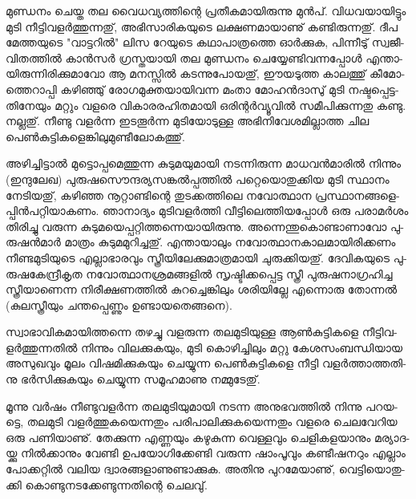 ­മു­ണ്ഡ­നം ചെ­യ്ത തല വൈ­ധ­വ്യ­ത്തി­ന്റെ പ്ര­തീ­ക­മാ­യി­രു­ന്നു മുന്‍­പ്. വി­ധ­വ­യാ­യി­ട്ടും മു­ടി നീ­ട്ടി­വ­ളര്‍­ത്തു­ന്ന­തു്, അഭി­സാ­രി­ക­യു­ടെ 
ലക്ഷ­ണ­മാ­യാ­ണു് കണ്ടി­രു­ന്ന­തു്. ദീപ മേ­ത്ത­യു­ടെ "വാ­ട്ട­റില്‍" ലിസ റേ­യു­ടെ കഥാ­പാ­ത്ര­ത്തെ ഓര്‍­ക്കു­ക, പി­ന്നീ­ടു് 
സ്വ­ജീ­വി­ത­ത്തില്‍ കാന്‍­സര്‍ ഗ്ര­സ്ത­യാ­യി തല മു­ണ്ഡ­നം ചെ­യ്യേ­ണ്ടി­വ­ന്ന­പ്പോള്‍ എന്താ­യി­രു­ന്നി­രി­ക്കു­മാ­വോ ആ മന­സ്സില്‍ 
കട­ന്നു­പോ­യ­തു്, ഈയ­ടു­ത്ത കാ­ല­ത്തു് കീ­മോ­ത്തെ­റാ­പ്പി കഴി­ഞ്ഞു് രോ­ഗ­മു­ക്ത­യാ­യി­വ­ന്ന മം­താ മോ­ഹന്‍­ദാ­സു് മു­ടി 
നഷ്ട­പ്പെ­ട്ട­തി­നേ­യും മറ്റും വള­രെ വി­കാ­ര­ര­ഹി­ത­മാ­യി ഒരി­ന്റര്‍­വ്യൂ­വില്‍ സമീ­പി­ക്കു­ന്ന­തു കണ്ടു. നല്ല­തു്. നീ­ണ്ടു വളര്‍­ന്ന ഇട­തൂര്‍­ന്ന 
മു­ടി­യോ­ടു­ള്ള അഭി­നി­വേ­ശ­മി­ല്ലാ­ത്ത ചില പെണ്‍­കു­ട്ടി­ക­ളെ­ങ്കി­ലു­മു­ണ്ടീ­ലോ­ക­ത്തു്.

അ­ഴി­ച്ചി­ട്ടാല്‍ മു­ട്ടൊ­പ്പ­മെ­ത്തു­ന്ന കു­ടു­മ­യു­മാ­യി നട­ന്നി­രു­ന്ന മാ­ധ­വന്‍­മാ­രില്‍ നി­ന്നും (ഇ­ന്ദു­ലേ­ഖ) 
പു­രു­ഷ­സൌ­ന്ദ­ര്യ­സ­ങ്കല്‍­പ്പ­ത്തില്‍ പറ്റെ­യൊ­തു­ക്കിയ മു­ടി സ്ഥാ­നം നേ­ടി­യ­തു്, കഴി­ഞ്ഞ നൂ­റ്റാ­ണ്ടി­ന്റെ തു­ട­ക്ക­ത്തി­ലെ 
നവോ­ത്ഥാന പ്ര­സ്ഥാ­ന­ങ്ങ­ളെ­പ്പിന്‍­പ­റ്റി­യാ­ക­ണം. ഞാ­നാ­ദ്യം മു­ടി­വ­ളര്‍­ത്തി വീ­ട്ടി­ലെ­ത്തി­യ­പ്പോള്‍ ഒരു പരാ­മര്‍­ശം തി­രി­ച്ചു 
വരു­ന്ന കു­ടു­മ­യെ­പ്പ­റ്റി­ത്ത­ന്നെ­യാ­യി­രു­ന്നു. അന്നെ­ന്തു­കൊ­ണ്ടാ­ണാ­വോ പു­രു­ഷന്‍­മാര്‍ മാ­ത്രം കു­ടു­മ­മു­റി­ച്ച­തു്. എന്താ­യാ­ലും 
നവോ­ത്ഥാ­ന­കാ­ല­മാ­യി­രി­ക്ക­ണം നീ­ണ്ട­മു­ടി­യു­ടെ എല്ലാ­ഭാ­ര­വും സ്ത്രീ­യി­ലേ­ക്കു­മാ­ത്ര­മാ­യി ചു­രു­ക്കി­യ­തു്.  ദേ­വി­ക­യു­ടെ 
പു­രു­ഷ­കേ­ന്ദ്രീ­കൃത നവോ­ത്ഥാ­ന­ശ്ര­മ­ങ്ങ­ളില്‍ സൃ­ഷ്ടി­ക്ക­പ്പെ­ട്ട സ്ത്രീ പു­രു­ഷ­നാ­ഗ്ര­ഹി­ച്ച സ്ത്രീ­യാ­ണെ­ന്ന നി­രീ­ക്ഷ­ണ­ത്തില്‍ 
കു­റ­ച്ചെ­ങ്കി­ലും ശരി­യി­ല്ലേ എന്നൊ­രു തോ­ന്നല്‍ (കു­ല­സ്ത്രീ­യും ചന്ത­പ്പെ­ണ്ണും ഉണ്ടാ­യ­തെ­ങ്ങ­നെ­).

­സ്വാ­ഭാ­വി­ക­മാ­യി­ത്ത­ന്നെ തഴ­ച്ചു വള­രു­ന്ന തല­മു­ടി­യു­ള്ള ആണ്‍­കു­ട്ടി­ക­ളെ നീ­ട്ടി­വ­ളര്‍­ത്തു­ന്ന­തില്‍ നി­ന്നും വി­ല­ക്കു­ക­യും, മു­ടി 
കൊ­ഴി­ച്ചി­ലും മറ്റു കേ­ശ­സം­ബ­ന്ധി­യായ അസു­ഖ­വും മൂ­ലം വി­ഷ­മി­ക്കു­ക­യും ചെ­യ്യു­ന്ന പെണ്‍­കു­ട്ടി­ക­ളെ നീ­ട്ടി വളര്‍­ത്താ­ത്ത­തി­നു 
ഭര്‍­സി­ക്കു­ക­യും ചെ­യ്യു­ന്ന സമൂ­ഹ­മാ­ണു നമ്മു­ടേ­തു്.

­മൂ­ന്നു വര്‍­ഷം നീ­ണ്ടു­വ­ളര്‍­ന്ന തല­മു­ടി­യു­മാ­യി നട­ന്ന അനു­ഭ­വ­ത്തില്‍ നി­ന്നു പറ­യ­ട്ടെ, ­ത­ല­മു­ടി­ വളര്‍­ത്തു­ക­യെ­ന്ന­തും 
പരി­പാ­ലി­ക്കു­ക­യെ­ന്ന­തും വള­രെ ചെ­ല­വേ­റിയ ഒരു പണി­യാ­ണു്. തേ­ക്കു­ന്ന എണ്ണ­യും കഴു­കു­ന്ന വെ­ള്ള­വും ചെ­ളി­ക­ള­യാ­നും 
മര്യാ­ദ­യ്ക്കു നില്‍­ക്കാ­നും വേ­ണ്ടി ഉപ­യോ­ഗി­ക്കേ­ണ്ടി വരു­ന്ന ഷാം­പൂ­വും കണ്ടീ­ഷ­ന­റും എല്ലാം പോ­ക്ക­റ്റില്‍ വലിയ 
ദ്വാ­ര­ങ്ങ­ളാ­ണു­ണ്ടാ­ക്കു­ക. അതി­നു പു­റ­മേ­യാ­ണു്, വെ­ട്ടി­യൊ­തു­ക്കി കൊ­ണ്ടു­ന­ട­ക്കേ­ണ്ടു­ന്ന­തി­ന്റെ ചെ­ല­വു്.

